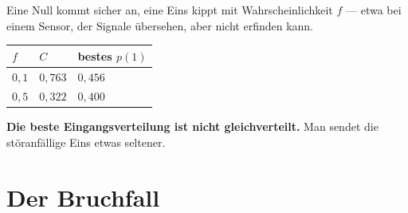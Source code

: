 \begin{merksatz}
Eine Null kommt sicher an, eine Eins kippt mit Wahrscheinlichkeit $f$ --- etwa bei einem Sensor, der Signale übersehen, aber nicht erfinden kann.

\begin{center}
{\small
\renewcommand{\arraystretch}{1.48}
\begin{tabular}{@{}P{1.6cm}P{2.0cm}P{2.6cm}@{}}
\toprule
$f$ & $C$ & \textbf{bestes $p(1)$}\\
\midrule
$0{,}1$ & $0{,}763$ & $0{,}456$\\
$0{,}5$ & $0{,}322$ & $0{,}400$\\
\bottomrule
\end{tabular}}
\end{center}

\begin{center}
\begin{minipage}{0.9\textwidth}
\textbf{Die beste Eingangsverteilung ist nicht gleichverteilt.} Man sendet die störanfällige Eins etwas seltener.
\end{minipage}
\end{center}

\begin{center}
\begin{minipage}{0.88\textwidth}
\end{minipage}
\end{center}
\end{merksatz}

\section{Der Bruchfall}


